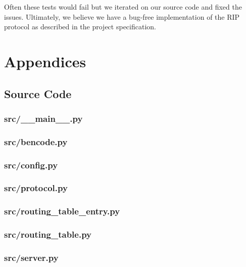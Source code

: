 \documentclass[11pt]{article} %
\begin{document}
\noindent Often these tests would fail but we iterated on our source code and fixed the issues. Ultimately, we believe we have a bug-free implementation of the RIP protocol as described in the project specification.

\newpage
\section{Appendices}

\subsection{Source Code}

\subsubsection{src/\_\_main\_\_.py}


\subsubsection{src/bencode.py}


\subsubsection{src/config.py}


\subsubsection{src/protocol.py}


\subsubsection{src/routing\_table\_entry.py}


\subsubsection{src/routing\_table.py}


\subsubsection{src/server.py}

\end{document}
